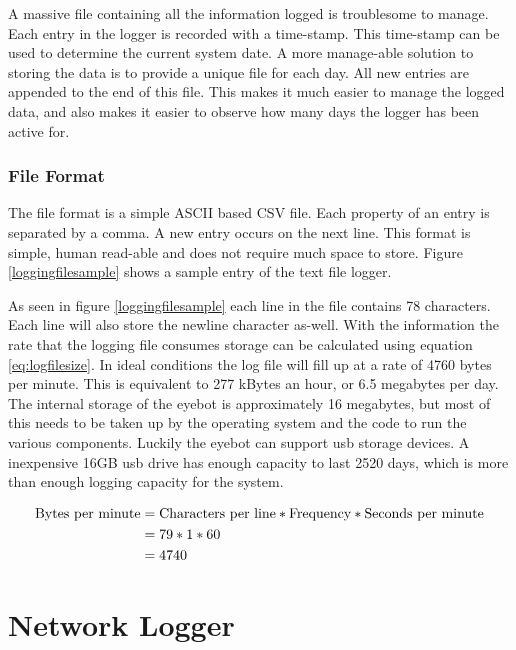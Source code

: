 A massive file containing all the information logged is troublesome to manage. Each entry in the logger is recorded with a time-stamp. This time-stamp can be used to determine the current system date. A more manage-able solution to storing the data is to provide a unique file for each day. All new entries are appended to the end of this file. This makes it much easier to manage the logged data, and also makes it easier to observe how many days the logger has been active for.

\subsubsection{File Format}

The file format is a simple ASCII based CSV file. Each property of an entry is separated by a comma. A new entry occurs on the next line. This format is simple, human read-able and does not require much space to store. Figure \ref{loggingfilesample} shows a sample entry of the text file logger.


As seen in figure \ref{loggingfilesample} each line in the file contains 78 characters. Each line will also store the newline character as-well. With the information the rate that the logging file consumes storage can be calculated using equation \ref{eq:logfilesize}. In ideal conditions the log file will fill up at a rate of 4760 bytes per minute.  This is equivalent to 277 kBytes an hour, or 6.5 megabytes per day. The internal storage of the eyebot is approximately 16 megabytes, but most of this needs to be taken up by the operating system and the code to run the various components. Luckily the eyebot can support usb storage devices.  A inexpensive 16GB usb drive has enough capacity to last 2520 days, which is more than enough logging capacity for the system.

\begin{align}
\label{eq:logfilesize}
\mathrm{Bytes\ per\ minute} &=\mathrm{Characters\ per\ line}* \mathrm{Frequency}*\mathrm{Seconds\ per\ minute}\\
&= 79*1*60 \notag \\
&= 4740 \notag
\end{align}

\section{Network Logger}

